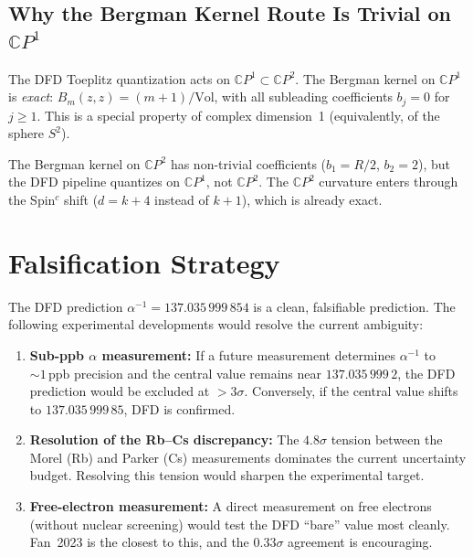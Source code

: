 \documentclass[12pt,a4paper]{article}
\theoremstyle{definition}
\theoremstyle{remark}
\newcommand{\CP}{\mathbb{C}P}
\newcommand{\inv}{^{-1}}
\newcommand{\ppb}{\,\mathrm{ppb}}
\begin{document}
\subsection{Why the Bergman Kernel Route Is Trivial on $\CP^1$}

The DFD Toeplitz quantization acts on $\CP^1 \subset \CP^2$. The Bergman
kernel on $\CP^1$ is \emph{exact}: $B_m(z,z) = (m+1)/\mathrm{Vol}$, with
all subleading coefficients $b_j = 0$ for $j \geq 1$. This is a special
property of complex dimension~1 (equivalently, of the sphere $S^2$).

The Bergman kernel on $\CP^2$ has non-trivial coefficients ($b_1 = R/2$,
$b_2 = 2$), but the DFD pipeline quantizes on $\CP^1$, not $\CP^2$. The
$\CP^2$ curvature enters through the Spin$^c$ shift ($d = k + 4$ instead of
$k + 1$), which is already exact.

\section{Falsification Strategy}
\label{sec:falsification}

The DFD prediction $\alpha\inv = 137.035\,999\,854$ is a clean, falsifiable
prediction. The following experimental developments would resolve the
current ambiguity:

\begin{enumerate}
\item \textbf{Sub-ppb $\alpha$ measurement:} If a future measurement
  determines $\alpha\inv$ to $\sim 1\ppb$ precision and the central value
  remains near $137.035\,999\,2$, the DFD prediction would be excluded at
  $>3\sigma$. Conversely, if the central value shifts to $137.035\,999\,85$,
  DFD is confirmed.

\item \textbf{Resolution of the Rb--Cs discrepancy:} The $4.8\sigma$
  tension between the Morel (Rb) and Parker (Cs) measurements dominates
  the current uncertainty budget. Resolving this tension would sharpen the
  experimental target.

\item \textbf{Free-electron measurement:} A direct measurement on free
  electrons (without nuclear screening) would test the DFD ``bare'' value
  most cleanly. Fan~2023 is the closest to this, and the $0.33\sigma$
  agreement is encouraging.
\end{enumerate}
\end{document}
